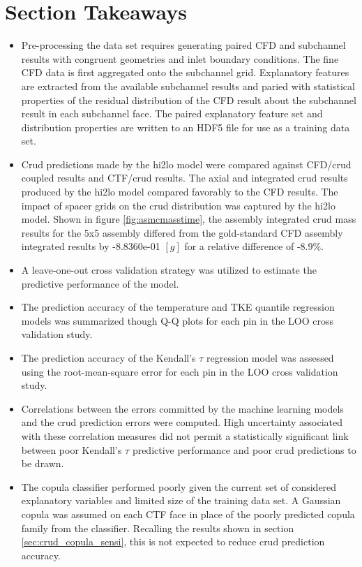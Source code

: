 \section{Section Takeaways}


\begin{itemize}
	\item Pre-processing the data set requires generating paired CFD and subchannel results with congruent geometries and inlet boundary conditions.  The fine CFD data is first aggregated onto the subchannel grid.  Explanatory features are extracted from the available subchannel results and paried with statistical properties of the residual distribution of the CFD result about the subchannel result in each subchannel face. The paired explanatory feature set and distribution properties are written to an HDF5 file for use as a training data set.
    \item Crud predictions made by the hi2lo model were compared against CFD/crud coupled results and CTF/crud results.  The axial and integrated crud results produced by the hi2lo model compared favorably to the CFD results.  The impact of spacer grids on the crud distribution was captured by the hi2lo model.  Shown in figure \ref{fig:asmcmasstime}, the assembly integrated crud mass results for the 5x5 assembly differed from the gold-standard CFD assembly integrated results by -8.8360e-01 $[g]$ for a relative difference of -8.9\%.
    \item A leave-one-out cross validation strategy was utilized to estimate the predictive performance of the model.
    \item The prediction accuracy of the temperature and TKE quantile regression models was summarized though Q-Q plots for each pin in the LOO cross validation study.
    \item The prediction accuracy of the Kendall's $\tau$ regression model was assessed using the root-mean-square error for each pin in the LOO cross validation study.  \item Correlations between the errors committed by the machine learning models and the crud prediction errors were computed.  High uncertainty associated with these correlation measures did not permit a statistically significant link between poor Kendall's $\tau$ predictive performance and poor crud predictions to be drawn.
    \item The copula classifier performed poorly given the current set of considered explanatory variables and limited size of the training data set.  A Gaussian copula was assumed on each CTF face in place of the poorly predicted copula family from the classifier.  Recalling the results shown in section \ref{sec:crud_copula_sensi}, this is not expected to reduce crud prediction accuracy.
\end{itemize}
